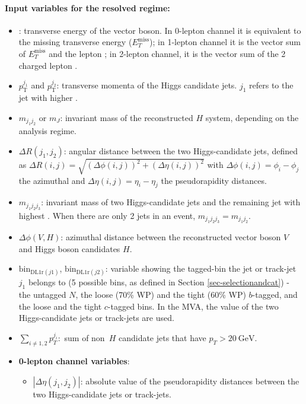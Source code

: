 \paragraph{Input variables for the resolved regime:}
\begin{itemize}
    \item \ptv: transverse energy of the vector boson. In 0-lepton channel it is equivalent to the missing transverse energy ($E_T^{\textrm{miss}}$); in 1-lepton channel it is the vector sum of $E_T^{\textrm{miss}}$ and the lepton \pt; in 2-lepton channel, it is the vector sum of the 2 charged lepton \pt.
    \item $p_{\text{T}}^{j_1}$ and $p_{\text{T}}^{j_2}$: transverse momenta of the Higgs candidate jets. $j_1$ refers to the jet with higher \pt.
    \item $m_{j_1j_2}$ or $m_J$: invariant mass of the reconstructed $H$ system, depending on the analysis regime.
    \item $\Delta R (j_1,j_2)$: angular distance between the two Higgs-candidate jets, defined as $\Delta R(i,j) = \sqrt{(\Delta\phi(i,j))^2+ (\Delta\eta (i,j))^2}$ with $\Delta\phi(i,j) = \phi_i-\phi_j$ the azimuthal and $\Delta \eta(i,j)= \eta_i-\eta_j$ the pseudorapidity distances.
    \item $m_{j_1 j_2 j_3}$: invariant mass of two Higgs-candidate jets and the remaining jet with highest \pt. When there are only 2 jets in an event, $m_{j_1 j_2 j_3}=m_{j_1j_2}$.
    \item $\Delta \phi(\textbf{$V$},\textbf{$H$})$: azimuthal distance between the reconstructed vector boson $V$ and Higgs boson candidates $H$.
    \item $\mathrm{bin}_{\mathrm{DL1r}(j1)}$, $\mathrm{bin}_{\mathrm{DL1r}(j2)}$: variable showing the tagged-bin the jet or track-jet $j_1$ belongs to (5 possible bins, as defined in Section \ref{sec-selectionandcat}) - the untagged $N$, the loose (70\% WP) and the tight (60\% WP) $b$-tagged, and the loose and the tight $c$-tagged bins. In the MVA, the value of the two Higgs-candidate jets or track-jets are used.
    \item $\sum\limits_{i\neq 1, 2}p_T^{j_i}$:\pt~sum of non~$H$ candidate jets that have $p_T>20~\text{GeV}$.
    \item \textbf{0-lepton channel variables}: 
    \begin{itemize}
        \item $|\Delta \eta (j_1,j_2)|$: absolute value of the pseudorapidity distances between the two Higgs-candidate jets or track-jets.

\end{itemize}
\end{itemize}
